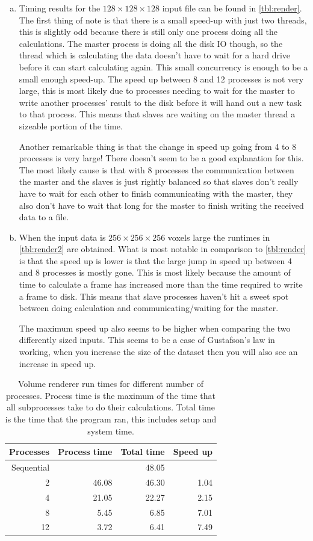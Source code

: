 \documentclass[a4paper]{article}
\begin{document}
\begin{enumerate}[(a)]
	\item Timing results for the $128 \times 128 \times 128$ input file can be found in \autoref{tbl:render}. The first thing of note is that there is a small speed-up with just two threads, this is slightly odd because there is still only one process doing all the calculations. The master process is doing all the disk IO though, so the thread which is calculating the data doesn't have to wait for a hard drive before it can start calculating again. This small concurrency is enough to be a small enough speed-up. The speed up between 8 and 12 processes is not very large, this is most likely due to processes needing to wait for the master to write another processes' result to the disk before it will hand out a new task to that process. This means that slaves are waiting on the master thread a sizeable portion of the time.
	
	Another remarkable thing is that the change in speed up going from 4 to 8 processes is very large! There doesn't seem to be a good explanation for this. The most likely cause is that with 8 processes the communication between the master and the slaves is just rightly balanced so that slaves don't really have to wait for each other to finish communicating with the master, they also don't have to wait that long for the master to finish writing the received data to a file.
	
	\item When the input data is $256 \times 256 \times 256$ voxels large the runtimes in \autoref{tbl:render2} are obtained. What is most notable in comparison to \autoref{tbl:render} is that the speed up is lower is that the large jump in speed up between 4 and 8 processes is mostly gone. This is most likely because the amount of time to calculate a frame has increased more than the time required to write a frame to disk. This means that slave processes haven't hit a sweet spot between doing calculation and communicating/waiting for the master.
	
	The maximum speed up also seems to be higher when comparing the two differently sized inputs. This seems to be a case of Gustafson's law in working, when you increase the size of the dataset then you will also see an increase in speed up.
\end{enumerate}

\begin{table}[h]
	\centering
	\caption{Volume renderer run times for different number of processes. Process time is the maximum of the time that all subprocesses take to do their calculations. Total time is the time that the program ran, this includes setup and system time.}
	\label{tbl:render}
	\begin{tabular}{r|r|r|r}
		Processes & Process time & Total time & Speed up\\ \hline
		Sequential & & 48.05 \\
		 2 & 46.08 & 46.30 & 1.04 \\
		 4 & 21.05 & 22.27 & 2.15 \\
		 8 &  5.45 &  6.85 & 7.01 \\
		12 &  3.72 &  6.41 & 7.49
	\end{tabular}
\end{table}
\end{document}
